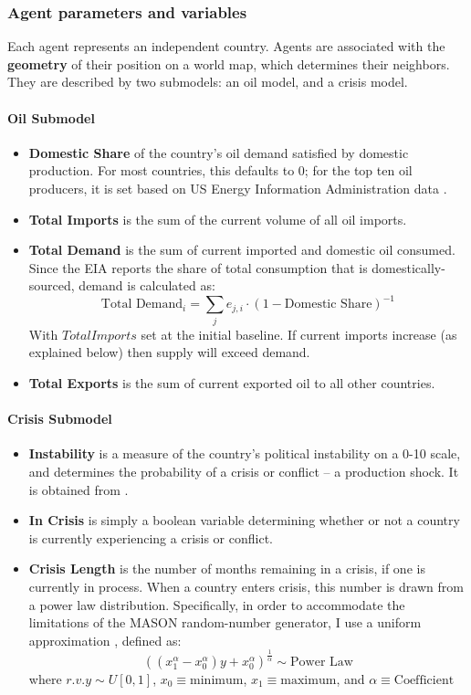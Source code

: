 \documentclass{llncs}
\begin{document}
\subsubsection{Agent parameters and variables}

Each agent represents an independent country. Agents are associated with the \textbf{geometry} of their position on a world map, which determines their neighbors. They are described by two submodels: an oil model, and a crisis model.

\paragraph{Oil Submodel}
\begin{itemize}
	\item \textbf{Domestic Share} of the country's oil demand satisfied by domestic production. For most countries, this defaults to 0; for the top ten oil producers, it is set based on US Energy Information Administration data \cite{eia_2013}.
	\item \textbf{Total Imports} is the sum of the current volume of all oil imports. 
	\item \textbf{Total Demand} is the sum of current imported and domestic oil consumed. Since the EIA reports the share of total consumption that is domestically-sourced, demand is calculated as: $$\text{Total Demand}_i = \sum_j e_{j,i} \cdot (1 - \text{Domestic Share})^{-1}$$
	With $Total Imports$ set at the initial baseline. If current imports increase (as explained below) then supply will exceed demand. 
	\item \textbf{Total Exports} is the sum of current exported oil to all other countries.
\end{itemize}

\paragraph{Crisis Submodel}
\begin{itemize}
	\item \textbf{Instability} is a measure of the country's political instability on a 0-10 scale, and determines the probability of a crisis or conflict -- a production shock. It is obtained from \cite{eiu_2013}. 
	\item \textbf{In Crisis} is simply a boolean variable determining whether or not a country is currently experiencing a crisis or conflict.
	\item \textbf{Crisis Length} is the number of months remaining in a crisis, if one is currently in process. When a country enters crisis, this number is drawn from a power law distribution. Specifically, in order to accommodate the limitations of the MASON random-number generator, I use a uniform approximation \cite{weisstein_2013}, defined as:
$$
\left((x_{1}^{\alpha} - x_{0}^{\alpha})y + x_{0}^{\alpha}\right)^{\frac{1}{\alpha}} \sim \text{Power Law}
$$
where $r.v. y \sim U[0,1]$, $ x_0  \equiv \text{minimum}$, $ x_1  \equiv \text{maximum}$, and $ \alpha \equiv \text{Coefficient}$

\end{itemize}
\end{document}
